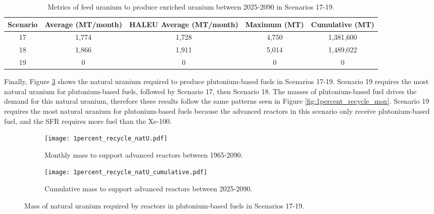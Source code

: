 \begin{table}[h!]
    \centering 
    \caption{Metrics of feed uranium to produce enriched uranium 
    between 2025-2090 in Scenarios 17-19.}
    \label{tab:s17-19_feed}
    \begin{tabular}{c c c c c}
        \hline 
        Scenario & Average (MT/month) & HALEU Average (MT/month) & 
        Maximum (MT) & Cumulative (MT) \\
        \hline
        17 & 1,774 & 1,728 & 4,750 & 1,381,600\\
        18 & 1,866 & 1,911 & 5,014 & 1,489,022\\
        19 & 0 & 0 & 0 & 0\\
        \hline
    \end{tabular}
\end{table}

Finally, Figure \ref{fig:1percent_recycle_natU} shows the natural uranium 
required to produce plutonium-based fuels in Scenarios 17-19. Scenario 
19 requires the most natural uranium for plutonium-based fuels, 
followed by Scenario 17, then Scenario 18. The masses of plutonium-based 
fuel drives the demand for this natural uranium, therefore these 
results follow the same patterns seen in Figure \ref{fig:1percent_recycle_mox}.
Scenario 19 requires the most natural uranium for plutonium-based 
fuels because the advanced reactors in this scenario only receive 
plutonium-based fuel, and the \gls{SFR} requires more fuel than 
the Xe-100. 

\begin{figure}[h!]
    \centering
    \begin{subfigure}[b]{0.45\textwidth}
        \centering
        \texttt{[image: 1percent\_recycle\_natU.pdf]}
        \caption{Monthly mass to support advanced reactors 
        between 1965-2090.}
        \label{fig:1percent_recycle_AR_natu}
    \end{subfigure}
    \hfill
    \begin{subfigure}[b]{0.45\textwidth}
        \centering
        \texttt{[image: 1percent\_recycle\_natU\_cumulative.pdf]}
        \caption{Cumulative mass to support
        advanced reactors between 2025-2090.}
        \label{fig:1percent_recycle_natu_cumulative}
    \end{subfigure}
       \caption{Mass of natural uranium required by reactors in 
       plutonium-based fuels in Scenarios 17-19.}
       \label{fig:1percent_recycle_natU}
\end{figure}

